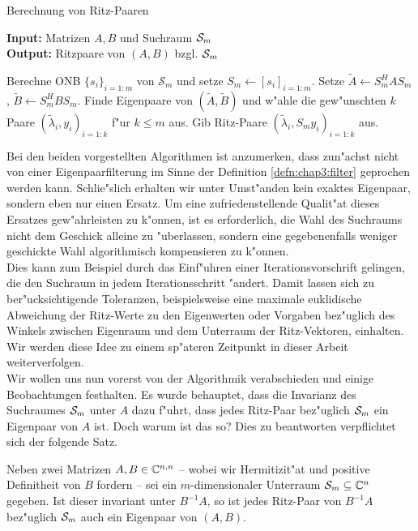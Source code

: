 \begin{algorithm}
\caption{Berechnung von Ritz-Paaren}\label{alg:chap3:grp}
\vspace{.15cm}
\textbf{Input:} Matrizen $A,B$ und Suchraum $\S_m$\\
\textbf{Output:} Ritzpaare von $(A,B)$ bzgl. $\S_m$
\begin{algorithmic}[1]
\State Berechne ONB $\{s_i\}_{i=1:m}$ von $\mathcal{S}_m$ und setze $S_m\gets[s_i]_{i=1:m}$.
\State Setze $\widetilde{A}\gets S_m^H A S_m$,
$\widetilde{B} \gets S_m^H BS_m$.
\State Finde Eigenpaare von $(\widetilde{A},\widetilde{B})$ und w"ahle die gew"unschten $k$ Paare $(\widetilde{\lambda}_i,y_i)_{i=1:k}$ f"ur $k\le m$ aus.
\State Gib Ritz-Paare $(\widetilde{\lambda}_i, S_m y_i)_{i=1:k}$ aus.
\end{algorithmic}
\end{algorithm}

Bei den beiden vorgestellten Algorithmen ist anzumerken, dass zun"achst nicht von einer Eigenpaarfilterung im Sinne der Definition \ref{defn:chap3:filter} geprochen werden kann.
Schlie"slich erhalten wir unter Umst"anden kein exaktes Eigenpaar, sondern eben nur einen Ersatz.
Um eine zufriedenstellende Qualit"at dieses Ersatzes gew"ahrleisten zu k"onnen, ist es erforderlich, die Wahl des Suchraums nicht dem Geschick alleine zu "uberlassen, sondern eine gegebenenfalls weniger geschickte Wahl algorithmisch kompensieren zu k"onnen.\\

Dies kann zum Beispiel durch das Einf"uhren einer Iterationsvorschrift gelingen, die den Suchraum in jedem Iterationsschritt "andert.
Damit lassen sich zu ber"ucksichtigende Toleranzen, beispielsweise eine maximale euklidische Abweichung der Ritz-Werte zu den Eigenwerten oder Vorgaben bez"uglich des Winkels zwischen Eigenraum und dem Unterraum der Ritz-Vektoren, einhalten.
Wir werden diese Idee zu einem sp"ateren Zeitpunkt in dieser Arbeit weiterverfolgen.\\

Wir wollen uns nun vorerst von der Algorithmik verabschieden und einige Beobachtungen
festhalten. Es wurde behauptet, dass die Invarianz des Suchraumes $\S_m$ unter
$A$ dazu f"uhrt, dass jedes Ritz-Paar bez"uglich $\S_m$ ein Eigenpaar von $A$ ist.
Doch warum ist das so? Dies zu beantworten verpflichtet sich der folgende Satz.

\newpage

\begin{thm}\label{thm:chap3:invariant}
Neben zwei Matrizen $A,B\in\Cnn$ -- wobei wir Hermitizit"at und positive Definitheit von $B$ fordern -- sei ein $m$-dimensionaler Unterraum $\S_m \subseteq \C^n$ gegeben.
Ist dieser invariant unter $B^{-1}A$, so ist jedes Ritz-Paar von $B^{-1}A$
bez"uglich $\S_m$ auch ein Eigenpaar von $(A,B)$.
\end{thm}

